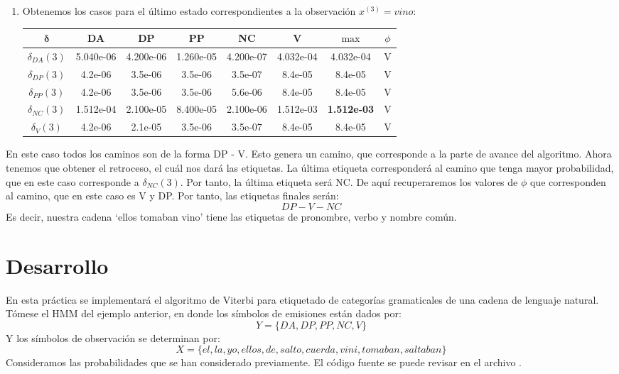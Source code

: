 \begin{enumerate}
     \item Obtenemos los casos para el último estado correspondientes a la observación $x^{(3)} = vino$:
        \begin{center}
        {\small
         \begin{tabular}{c c c c c c | c c} \hline
            $\mathbf{\delta}$ & DA & DP & PP & NC & V & $\max$ & $\phi$\\ \hline
            $\delta_{DA}(3)$  & 5.040e-06 & 4.200e-06 & 1.260e-05 & 4.200e-07 & 4.032e-04 & 4.032e-04 & V \\
            $\delta_{DP}(3)$  & 4.2e-06 & 3.5e-06 & 3.5e-06 & 3.5e-07 & 8.4e-05 & 8.4e-05 & V \\
            $\delta_{PP}(3)$  & 4.2e-06 & 3.5e-06 & 3.5e-06 & 5.6e-06 & 8.4e-05 & 8.4e-05 & V \\
            $\delta_{NC}(3)$  & 1.512e-04 & 2.100e-05 & 8.400e-05 & 2.100e-06 & 1.512e-03 & \textbf{1.512e-03} & V \\
            $\delta_{V}(3)$  & 4.2e-06 & 2.1e-05 & 3.5e-06 & 3.5e-07 & 8.4e-05 & 8.4e-05 & V\\ \hline
         \end{tabular}}
     \end{center}
 \end{enumerate}

En este caso todos los caminos son de la forma DP - V. Esto genera un camino, que corresponde a la parte de avance del algoritmo. Ahora tenemos que obtener el retroceso, el cuál nos dará las etiquetas. La última etiqueta corresponderá al camino que tenga mayor probabilidad, que en este caso corresponde a $\delta_{NC}(3)$. Por tanto, la última etiqueta será NC. De aquí recuperaremos los valores de $\phi$ que corresponden al camino, que en este caso es V y DP. Por tanto, las etiquetas finales serán:
$$DP - V - NC$$
Es decir, nuestra cadena `ellos tomaban vino' tiene las etiquetas de pronombre, verbo y nombre común.






\section{Desarrollo}

En esta práctica se implementará el algoritmo de Viterbi para etiquetado de categorías gramaticales de una cadena de lenguaje natural. 
Tómese el HMM del ejemplo anterior, en donde los símbolos de emisiones están dados por: $$Y = \{DA, DP, PP, NC, V\}$$ Y los símbolos de observación se determinan por: $$X = \{el, la, yo, ellos, de, salto, cuerda, vini, tomaban, saltaban\}$$
Consideramos las probabilidades que se han considerado previamente. El código fuente se puede revisar en el archivo . 

